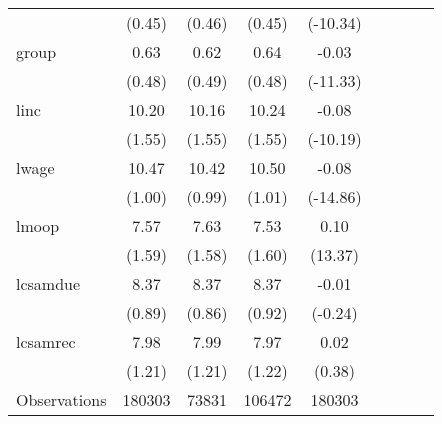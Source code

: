 {\begin{tabular}{l*{4}{cc}}
                    &      (0.45)&      (0.46)&      (0.45)&    (-10.34)         \\
group               &        0.63&        0.62&        0.64&       -0.03\sym{***}\\
                    &      (0.48)&      (0.49)&      (0.48)&    (-11.33)         \\
linc                &       10.20&       10.16&       10.24&       -0.08\sym{***}\\
                    &      (1.55)&      (1.55)&      (1.55)&    (-10.19)         \\
lwage               &       10.47&       10.42&       10.50&       -0.08\sym{***}\\
                    &      (1.00)&      (0.99)&      (1.01)&    (-14.86)         \\
lmoop               &        7.57&        7.63&        7.53&        0.10\sym{***}\\
                    &      (1.59)&      (1.58)&      (1.60)&     (13.37)         \\
lcsamdue            &        8.37&        8.37&        8.37&       -0.01         \\
                    &      (0.89)&      (0.86)&      (0.92)&     (-0.24)         \\
lcsamrec            &        7.98&        7.99&        7.97&        0.02         \\
                    &      (1.21)&      (1.21)&      (1.22)&      (0.38)         \\
\hline
Observations        &      180303&       73831&      106472&      180303         \\
\hline\hline
\end{tabular}
}
